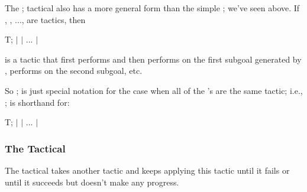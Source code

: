 \documentclass[12pt]{report}
\begin{document}
 The ; tactical also has a more general form than the simple
    ; we've seen above.  If , , ...,  are tactics,
    then


      T;  \ensuremath{|}  \ensuremath{|} ... \ensuremath{|} 


    is a tactic that first performs  and then performs  on the
    first subgoal generated by , performs  on the second
    subgoal, etc.


    So ; is just special notation for the case when all of the
    's are the same tactic; i.e., ; is shorthand for:


      T;  \ensuremath{|}  \ensuremath{|} ... \ensuremath{|} 

\begin{coqdoccode}
\coqdocemptyline
\end{coqdoccode}
\subsubsection{The \texorpdfstring{\protect{}}{repeat} Tactical}



 The  tactical takes another tactic and keeps applying this
    tactic until it fails or until it succeeds but doesn't make any
    progress.
\end{document}
